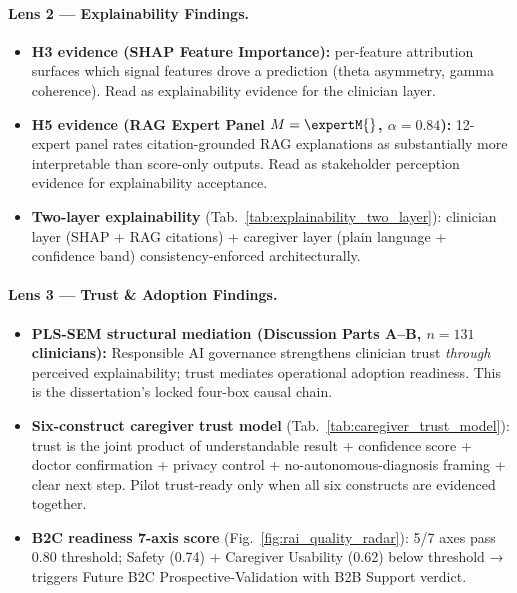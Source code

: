 \paragraph{Lens 2 --- Explainability Findings.}
\label{para:lens_explainability}
\begin{itemize}[leftmargin=*, itemsep=3pt]
    \item \textbf{H3 evidence (SHAP Feature Importance):} per-feature attribution surfaces which signal features drove a prediction (theta asymmetry, gamma coherence). Read as explainability evidence for the clinician layer.
    \item \textbf{H5 evidence (RAG Expert Panel $M = \expertM{}$, $\alpha = 0.84$):} 12-expert panel rates citation-grounded RAG explanations as substantially more interpretable than score-only outputs. Read as stakeholder perception evidence for explainability acceptance.
    \item \textbf{Two-layer explainability} (Tab.~\ref{tab:explainability_two_layer}): clinician layer (SHAP + RAG citations) + caregiver layer (plain language + confidence band) consistency-enforced architecturally.
\end{itemize}

\paragraph{Lens 3 --- Trust \& Adoption Findings.}
\label{para:lens_trust_adoption}
\begin{itemize}[leftmargin=*, itemsep=3pt]
    \item \textbf{PLS-SEM structural mediation (Discussion Parts A--B, $n = 131$ clinicians):} Responsible AI governance strengthens clinician trust \emph{through} perceived explainability; trust mediates operational adoption readiness. This is the dissertation's locked four-box causal chain.
    \item \textbf{Six-construct caregiver trust model} (Tab.~\ref{tab:caregiver_trust_model}): trust is the joint product of understandable result + confidence score + doctor confirmation + privacy control + no-autonomous-diagnosis framing + clear next step. Pilot trust-ready only when all six constructs are evidenced together.
    \item \textbf{B2C readiness 7-axis score} (Fig.~\ref{fig:rai_quality_radar}): 5/7 axes pass 0.80 threshold; Safety (0.74) + Caregiver Usability (0.62) below threshold → triggers Future B2C Prospective-Validation with B2B Support verdict.
\end{itemize}

